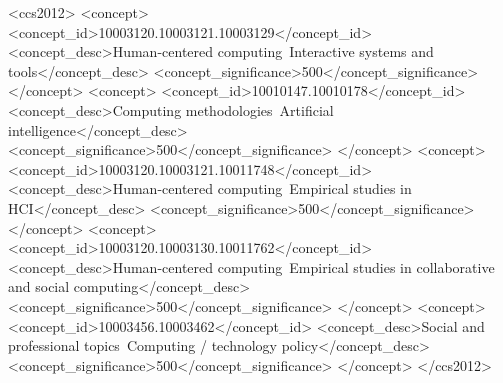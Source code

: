\documentclass[manuscript, review, anonymous]{acmart}
\begin{document}
\title[]{}


\author{Alice Qian}
\author{Ziqi Yang}


\author{Ryland Shaw}


\author{Jina Suh}

      
\author{Laura Dabbish}

  
\author{Hong Shen}





  \begin{CCSXML}
<ccs2012>
   <concept>
       <concept_id>10003120.10003121.10003129</concept_id>
       <concept_desc>Human-centered computing~Interactive systems and tools</concept_desc>
       <concept_significance>500</concept_significance>
       </concept>
   <concept>
       <concept_id>10010147.10010178</concept_id>
       <concept_desc>Computing methodologies~Artificial intelligence</concept_desc>
       <concept_significance>500</concept_significance>
       </concept>
   <concept>
       <concept_id>10003120.10003121.10011748</concept_id>
       <concept_desc>Human-centered computing~Empirical studies in HCI</concept_desc>
       <concept_significance>500</concept_significance>
       </concept>
   <concept>
       <concept_id>10003120.10003130.10011762</concept_id>
       <concept_desc>Human-centered computing~Empirical studies in collaborative and social computing</concept_desc>
       <concept_significance>500</concept_significance>
       </concept>
   <concept>
       <concept_id>10003456.10003462</concept_id>
       <concept_desc>Social and professional topics~Computing / technology policy</concept_desc>
       <concept_significance>500</concept_significance>
       </concept>
 </ccs2012>
\end{CCSXML}

\end{document}
